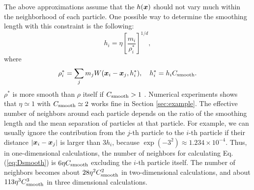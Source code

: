 \documentclass{cjour}
\newcommand{ \Vec   }[1]{ \mbox{\boldmath $ #1 $} }
\begin{document}
\begin{article}
The above approximations 
assume that the $h(\Vec{x})$ should not vary much 
within the neighborhood of each particle. 
One possible way to determine the smoothing length with this 
constraint is the following: 
\begin{equation}
                 h_i = \eta \left[ \frac{m_i}{\rho^*_i} \right]^{1/d}, 
\end{equation}
where 
\begin{equation}
                 \rho^*_i  = 
                 \sum_{j} m_{j} 
                  W(\Vec{x}_{i} - \Vec{x}_{j} , h^*_i  ) , 
                  ~~~ h^*_i = h_i C_{\rm smooth}.    
                                                     \label{eq:Dsmooth}
\end{equation}
$\rho^*$ is more smooth than $\rho$ itself if $C_{\rm smooth} > 1$ .    
Numerical experiments shows that 
$\eta \simeq 1$ with $C_{\rm smooth} \simeq 2$ 
works fine in Section \ref{sec:example}.  
The effective number of neighbors around each particle 
depends on the ratio of the smoothing length and the mean separation 
of particles at that particle.  
For example, we can usually ignore the contribution from 
the $j$-th particle to the $i$-th particle 
if their distance $|\Vec{x}_i-\Vec{x}_j|$ is 
larger than $3 h_i$, because $\exp(-3^2) \approx 1.234 \times 10^{-4}$. 
Thus, in one-dimensional calculations, the number of neighbors for 
calculating Eq.(\ref{eq:Dsmooth}) is $6 \eta C_{\rm smooth}$ 
excluding the $i$-th particle itself.  
The number of neighbors becomes about $28 \eta^2 C_{\rm smooth}^2$ 
in two-dimensional calculations,  
and about $113 \eta^3 C_{\rm smooth}^3$ in three dimensional 
calculations.  
                                                     



\end{article}
\end{document}
